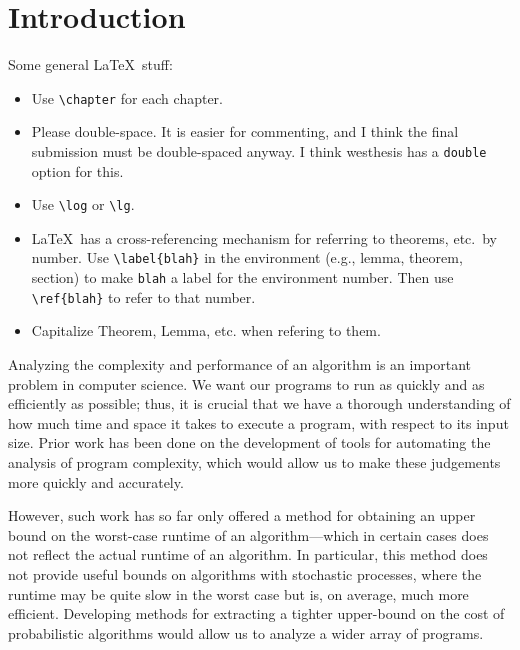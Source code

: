 \section{Introduction}
\begin{ndBlockComment}
Some general \LaTeX\ stuff:
\begin{itemize}
\item Use \verb!\chapter! for each chapter.

\item
Please double-space.  It is easier for commenting, and I think
the final submission must be double-spaced anyway.  I think
\textsf{westhesis} has a \verb!double! option for this.

\item Use \verb!\log! or \verb!\lg!.

\item
\LaTeX\ has a cross-referencing
mechanism for referring to theorems, etc.\ by number.  
Use \verb!\label{blah}! in the environment
(e.g., lemma, theorem, section) to make \verb!blah! a label for the
environment number.  Then use \verb!\ref{blah}! to refer to that number.

\item Capitalize Theorem, Lemma, etc. when refering to them.

\end{itemize}
\end{ndBlockComment}

Analyzing the complexity and performance of an algorithm is an important problem in computer science. We want our programs to run as quickly and as efficiently as possible; thus, it is crucial that we have a thorough understanding of how much time and space it takes to execute a program, with respect to its input size. Prior work has been done on the development of tools
for automating the analysis of program complexity, which would allow us to make these judgements more quickly and accurately. 

However, such work has so far only offered a method for obtaining an upper bound on the worst-case runtime of an algorithm---which in certain cases does not reflect the actual runtime of an algorithm. In particular, this method does not
provide useful bounds on algorithms with stochastic processes, where the runtime may be quite slow in the worst case but
is, on average, much more efficient. Developing methods for extracting a tighter upper-bound on the cost of probabilistic algorithms would allow us to analyze a wider array of programs.

